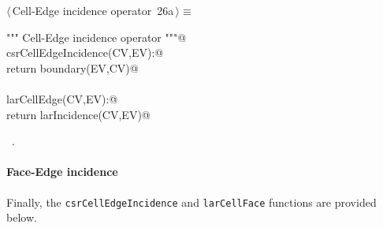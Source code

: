 \documentclass[11pt,oneside]{article}	%
\begin{document}
\begin{flushleft} \small \label{scrap41}
\protect{}$\langle\,$Cell-Edge incidence operator\nobreak\ {\footnotesize 26a}$\,\rangle\equiv$
\vspace{-1ex}
\begin{list}{}{} \item
\mbox{}\verb@""" Cell-Edge incidence operator """@\\
\mbox{}\verb@def csrCellEdgeIncidence(CV,EV):@\\
\mbox{}\verb@    return boundary(EV,CV)@\\
\mbox{}\verb@@\\
\mbox{}\verb@def larCellEdge(CV,EV):@\\
\mbox{}\verb@   return larIncidence(CV,EV)@\\
\mbox{}\verb@@{\NWsep}
\end{list}
\vspace{-1ex}
\footnotesize\addtolength{\baselineskip}{-1ex}
\begin{list}{}{\setlength{\itemsep}{-\parsep}\setlength{\itemindent}{-\leftmargin}}
\item \NWtxtMacroRefIn\ .
\end{list}
\end{flushleft}

\paragraph{Face-Edge incidence}
Finally, the \texttt{csrCellEdgeIncidence} and \texttt{larCellFace} functions are provided below.
\end{document}
